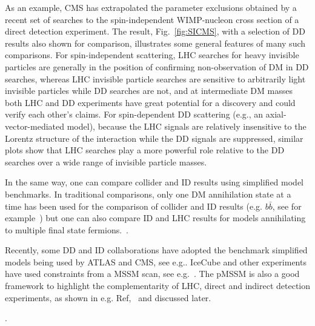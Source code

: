 As an example, CMS has extrapolated the parameter exclusions obtained by a recent set of searches to the spin-independent WIMP-nucleon cross section of a direct detection experiment.
The result, Fig.~\ref{fig:SICMS}, with a selection of DD results also shown for comparison, illustrates some general features of many such comparisons.
For spin-independent scattering, LHC searches for heavy invisible particles are generally in the position of confirming non-observation of DM in DD searches, whereas LHC invisible particle searches are sensitive to arbitrarily light invisible particles while DD searches are not, and at intermediate DM masses both LHC and DD experiments have great potential for a discovery and could verify each other's claims.
For spin-dependent DD scattering (e.g., an axial-vector-mediated model), because the LHC signals are relatively insensitive to the Lorentz structure of the interaction while the DD signals are suppressed, similar plots show that LHC searches play a more powerful role relative to the DD searches over a wide range of invisible particle masses. 

In the same way, one can compare collider and ID results using simplified model benchmarks. In traditional comparisons, only one DM annihilation state at a time has been used for the comparison of collider and ID results (e.g. $b\bar{b}$, see for example~\cite{Agrawal:2014una}) but one can also compare ID and LHC results for models annihilating to multiple final state fermions.~\cite{Carpenter:2016thc}.

Recently, some DD and ID collaborations have adopted the benchmark simplified models being used by ATLAS and CMS, see e.g.\cite{PhysRevLett.118.251301,Balazs:2017hxh}.
IceCube and other experiments have used constraints from a MSSM scan, see e.g.~\cite{Aartsen:2016zhm}. The pMSSM is also a good framework to highlight the complementarity of LHC, direct and indirect detection experiments, as shown in e.g. Ref,~\cite{Cahill-Rowley:2014twa} and discussed later. %


\begin{marginnote}[]
\end{marginnote}. 

